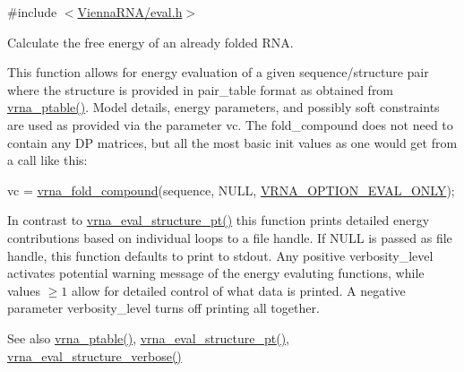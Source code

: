 {\ttfamily \#include $<$\hyperlink{eval_8h}{Vienna\+R\+N\+A/eval.\+h}$>$}



Calculate the free energy of an already folded R\+NA. 

This function allows for energy evaluation of a given sequence/structure pair where the structure is provided in pair\+\_\+table format as obtained from \hyperlink{group__struct__utils_gae829fb8bb7f694c12a9c0bbc34c77c60}{vrna\+\_\+ptable()}. Model details, energy parameters, and possibly soft constraints are used as provided via the parameter \textquotesingle{}vc\textquotesingle{}. The fold\+\_\+compound does not need to contain any DP matrices, but all the most basic init values as one would get from a call like this\+: 
\begin{DoxyCode}
vc = \hyperlink{group__fold__compound_ga6601d994ba32b11511b36f68b08403be}{vrna\_fold\_compound}(sequence, NULL, \hyperlink{group__fold__compound_ga61469c423131552c8483229f8b6c7e0e}{VRNA\_OPTION\_EVAL\_ONLY});
\end{DoxyCode}
 In contrast to \hyperlink{group__eval_gadbd09372ddfd7a450bbd590c96a6bfe4}{vrna\+\_\+eval\+\_\+structure\+\_\+pt()} this function prints detailed energy contributions based on individual loops to a file handle. If N\+U\+LL is passed as file handle, this function defaults to print to stdout. Any positive {\ttfamily verbosity\+\_\+level} activates potential warning message of the energy evaluting functions, while values $ \ge 1 $ allow for detailed control of what data is printed. A negative parameter {\ttfamily verbosity\+\_\+level} turns off printing all together.

\begin{DoxySeeAlso}{See also}
\hyperlink{group__struct__utils_gae829fb8bb7f694c12a9c0bbc34c77c60}{vrna\+\_\+ptable()}, \hyperlink{group__eval_gadbd09372ddfd7a450bbd590c96a6bfe4}{vrna\+\_\+eval\+\_\+structure\+\_\+pt()}, \hyperlink{group__eval_ga0928d699d310178f84ee2351034e5cb5}{vrna\+\_\+eval\+\_\+structure\+\_\+verbose()}
\end{DoxySeeAlso}

